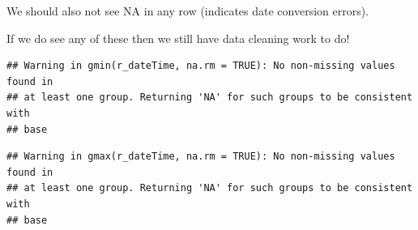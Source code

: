 \documentclass[]{article}
\begin{document}
We should also not see NA in any row (indicates date conversion errors).

If we do see any of these then we still have data cleaning work to do!

\begin{verbatim}
## Warning in gmin(r_dateTime, na.rm = TRUE): No non-missing values found in
## at least one group. Returning 'NA' for such groups to be consistent with
## base
\end{verbatim}

\begin{verbatim}
## Warning in gmax(r_dateTime, na.rm = TRUE): No non-missing values found in
## at least one group. Returning 'NA' for such groups to be consistent with
## base
\end{verbatim}

\begin{table}


\end{table}
\end{document}
